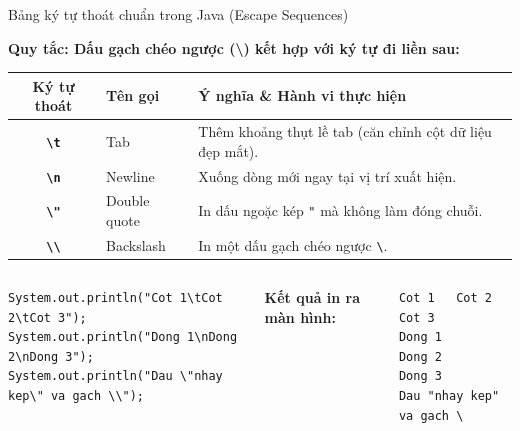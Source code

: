 \documentclass[aspectratio=169, 10pt]{beamer}
\begin{document}
\begin{frame}[fragile]{Bảng ký tự thoát chuẩn trong Java (Escape Sequences)}
  \begin{block}{\textbf{Quy tắc: Dấu gạch chéo ngược (\textbackslash) kết hợp với ký tự đi liền sau:}}
    \centering
    \small
    \begin{tabularx}{0.9\textwidth}{c l X}
      \toprule
      \textbf{Ký tự thoát} & \textbf{Tên gọi} & \textbf{Ý nghĩa \& Hành vi thực hiện} \\
      \midrule
      \texttt{\textbf{\textbackslash t}} & Tab & Thêm khoảng thụt lề tab (căn chỉnh cột dữ liệu đẹp mắt). \\
      \texttt{\textbf{\textbackslash n}} & Newline & Xuống dòng mới ngay tại vị trí xuất hiện. \\
      \texttt{\textbf{\textbackslash"}} & Double quote & In dấu ngoặc kép \texttt{"} mà không làm đóng chuỗi. \\
      \texttt{\textbf{\textbackslash\textbackslash}} & Backslash & In một dấu gạch chéo ngược \texttt{\textbackslash}. \\
      \bottomrule
    \end{tabularx}
  \end{block}

  \vspace{1mm}
  \begin{columns}
    \begin{lstlisting}[caption={Ví dụ sử dụng Escape Sequences}]
System.out.println("Cot 1\tCot 2\tCot 3");
System.out.println("Dong 1\nDong 2\nDong 3");
System.out.println("Dau \"nhay kep\" va gach \\");
    \end{lstlisting}

    \textbf{Kết quả in ra màn hình:}
    \begin{lstlisting}[style=terminalStyle]
Cot 1   Cot 2   Cot 3
Dong 1
Dong 2
Dong 3
Dau "nhay kep" va gach \
    \end{lstlisting}
  \end{columns}
\end{frame}
\end{document}
